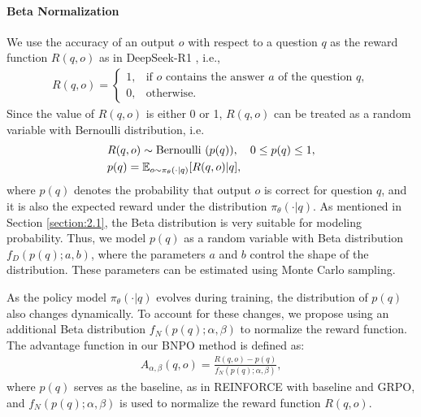 \documentclass{article}
\theoremstyle{plain}
\theoremstyle{definition}
\theoremstyle{remark}
\begin{document}
\paragraph{Beta Normalization}
We use the accuracy of an output $o$ with respect to a question $q$ as the reward function $R(q,o)$ as in DeepSeek-R1 \citep{guo2025deepseek}, i.e.,
\begin{align}
\label{equation:8}
    R(q,o)=
    \begin{cases}
    1, & \text{if } o \text{ contains the answer } a \text{ of the question }q,\\
    0, & \text{otherwise.}
    \end{cases}
\end{align}
Since the value of $R(q,o)$ is either 0 or 1, $R(q,o)$ can be treated as a random variable with Bernoulli distribution, i.e. 
\begin{align}
\label{equation:10}
&R(q,o)\sim \text{Bernoulli }(p(q)), \quad 0\leq p(q)\leq 1,\notag\\
&p(q)=\mathbb{E}_{o\sim\pi_\theta(\cdot| q)}[R(q, o) | q],
\end{align}
where $p(q)$ denotes the probability that output $o$ is correct for question $q$, and it is also the expected reward under the distribution $\pi_\theta(\cdot| q)$. As mentioned in Section \ref{section:2.1}, the Beta distribution is very suitable for modeling probability. Thus, we model $p(q)$ as a random variable with Beta distribution $f_{D}(p(q);a,b)$, where the parameters $a$ and $b$ control the shape of the distribution. These parameters can be estimated using Monte Carlo sampling.

As the policy model $\pi_\theta(\cdot| q)$ evolves during training, the distribution of $p(q)$ also changes dynamically. To account for these changes, we propose using an additional Beta distribution $f_{N}(p(q);\alpha,\beta)$ to normalize the reward function. The advantage function in our BNPO method is defined as:
\begin{align}
\label{equation:11}
    A_{\alpha, \beta}(q,o)= \frac{R(q,o)-p(q)}{f_{N}(p(q);\alpha,\beta)},
\end{align}
where $p(q)$ serves as the baseline, as in REINFORCE with baseline and GRPO, and $f_{N}(p(q);\alpha,\beta)$ is used to normalize the reward function $R(q,o)$.
\end{document}
